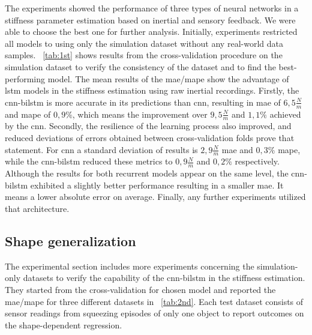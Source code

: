 \documentclass[a4paper, 10pt, twoside]{report}
\begin{document}
The experiments showed the performance of three types of neural networks in a stiffness parameter estimation based on inertial and sensory feedback. We were able to choose the best one for further analysis. Initially, experiments restricted all models to using only the simulation dataset without any real-world data samples. \Table~\ref{tab:1st} shows results from the cross-validation procedure on the simulation dataset to verify the consistency of the dataset and to find the best-performing model. The mean results of the \acrshort{mae}/\acrshort{mape} show the advantage of \acrshort{lstm} models in the stiffness estimation using raw inertial recordings. Firstly, the \acrshort{cnn}-\acrshort{bilstm} is more accurate in its predictions than \acrshort{cnn}, resulting in \acrshort{mae} of $6,5\frac{N}{m}$ and \acrshort{mape} of $0,9\%$, which means the improvement over $9,5\frac{N}{m}$ and $1,1\%$ achieved by the \acrshort{cnn}. Secondly, the resilience of the learning process also improved, and reduced deviations of errors obtained between cross-validation folds prove that statement. For \acrshort{cnn} a standard deviation of results is $2,9\frac{N}{m}$ \acrshort{mae} and $0,3\%$ \acrshort{mape}, while the \acrshort{cnn}-\acrshort{bilstm} reduced these metrics to $0,9\frac{N}{m}$ and $0,2\%$ respectively. Although the results for both recurrent models appear on the same level, the \acrshort{cnn}-\acrshort{bilstm} exhibited a slightly better performance resulting in a smaller \acrshort{mae}. It means a lower absolute error on average. Finally, any further experiments utilized that architecture.

\subsection{Shape generalization}
\label{part:experiments:materials:stiffness:estimation:generalization}

The experimental section includes more experiments concerning the simulation-only datasets to verify the capability of the \acrshort{cnn}-\acrshort{bilstm} in the stiffness estimation. They started from the cross-validation for chosen model and reported the \acrshort{mae}/\acrshort{mape} for three different datasets in \Table~\ref{tab:2nd}. Each test dataset consists of sensor readings from squeezing episodes of only one object to report outcomes on the shape-dependent regression. 
\end{document}
